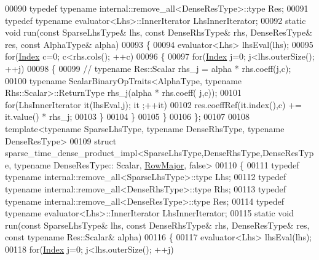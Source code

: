 \begin{DoxyCode}
00090   \textcolor{keyword}{typedef} \textcolor{keyword}{typename} internal::remove\_all<DenseResType>::type Res;
00091   \textcolor{keyword}{typedef} \textcolor{keyword}{typename} evaluator<Lhs>::InnerIterator LhsInnerIterator;
00092   \textcolor{keyword}{static} \textcolor{keywordtype}{void} run(\textcolor{keyword}{const} SparseLhsType& lhs, \textcolor{keyword}{const} DenseRhsType& rhs, DenseResType& res, \textcolor{keyword}{const} AlphaType& 
      alpha)
00093   \{
00094     evaluator<Lhs> lhsEval(lhs);
00095     \textcolor{keywordflow}{for}(\hyperlink{namespace_eigen_a62e77e0933482dafde8fe197d9a2cfde}{Index} c=0; c<rhs.cols(); ++c)
00096     \{
00097       \textcolor{keywordflow}{for}(\hyperlink{namespace_eigen_a62e77e0933482dafde8fe197d9a2cfde}{Index} j=0; j<lhs.outerSize(); ++j)
00098       \{
00099 \textcolor{comment}{//        typename Res::Scalar rhs\_j = alpha * rhs.coeff(j,c);}
00100         \textcolor{keyword}{typename} ScalarBinaryOpTraits<AlphaType, typename Rhs::Scalar>::ReturnType rhs\_j(alpha * rhs.coeff(
      j,c));
00101         \textcolor{keywordflow}{for}(LhsInnerIterator it(lhsEval,j); it ;++it)
00102           res.coeffRef(it.index(),c) += it.value() * rhs\_j;
00103       \}
00104     \}
00105   \}
00106 \};
00107 
00108 \textcolor{keyword}{template}<\textcolor{keyword}{typename} SparseLhsType, \textcolor{keyword}{typename} DenseRhsType, \textcolor{keyword}{typename} DenseResType>
00109 \textcolor{keyword}{struct }sparse\_time\_dense\_product\_impl<SparseLhsType,DenseRhsType,DenseResType, typename DenseResType::
      Scalar, \hyperlink{group__enums_ggaacded1a18ae58b0f554751f6cdf9eb13acfcde9cd8677c5f7caf6bd603666aae3}{RowMajor}, false>
00110 \{
00111   \textcolor{keyword}{typedef} \textcolor{keyword}{typename} internal::remove\_all<SparseLhsType>::type Lhs;
00112   \textcolor{keyword}{typedef} \textcolor{keyword}{typename} internal::remove\_all<DenseRhsType>::type Rhs;
00113   \textcolor{keyword}{typedef} \textcolor{keyword}{typename} internal::remove\_all<DenseResType>::type Res;
00114   \textcolor{keyword}{typedef} \textcolor{keyword}{typename} evaluator<Lhs>::InnerIterator LhsInnerIterator;
00115   \textcolor{keyword}{static} \textcolor{keywordtype}{void} run(\textcolor{keyword}{const} SparseLhsType& lhs, \textcolor{keyword}{const} DenseRhsType& rhs, DenseResType& res, \textcolor{keyword}{const} \textcolor{keyword}{typename} 
      Res::Scalar& alpha)
00116   \{
00117     evaluator<Lhs> lhsEval(lhs);
00118     \textcolor{keywordflow}{for}(\hyperlink{namespace_eigen_a62e77e0933482dafde8fe197d9a2cfde}{Index} j=0; j<lhs.outerSize(); ++j)

\end{DoxyCode}
